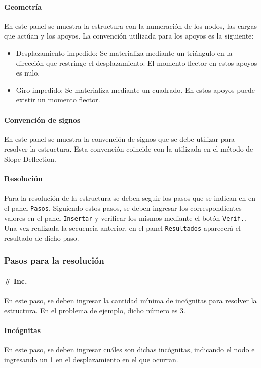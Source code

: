 \paragraph{Geometría}
En este panel se muestra la estructura con la numeración de los nodos, las cargas que actúan y los apoyos. La convención utilizada para los apoyos es la siguiente:
\begin{itemize}
	\item Desplazamiento impedido: Se materializa mediante un triángulo en la dirección que restringe el desplazamiento. El momento flector en estos apoyos es nulo.
	\item Giro impedido: Se materializa mediante un cuadrado. En estos apoyos puede existir un momento flector.  
\end{itemize}

\paragraph{Convención de signos}
En este panel se muestra la convención de signos que se debe utilizar para resolver la estructura. Esta convención coincide con la utilizada en el método de Slope-Deflection.

\paragraph{Resolución}
Para la resolución de la estructura se deben seguir los pasos que se indican en en el panel \verb|Pasos|. Siguiendo estos pasos, se deben ingresar los correspondientes valores en el panel \verb|Insertar| y verificar los mismos mediante el botón \verb|Verif.|. Una vez realizada la secuencia anterior, en el panel \verb|Resultados| aparecerá el resultado de dicho paso.

\subsubsection{Pasos para la resolución}

\paragraph{# Inc.}
En este paso, se deben ingresar la cantidad mínima de incógnitas para resolver la estructura. En el problema de ejemplo, dicho número es 3.

\paragraph{Incógnitas}
En este paso, se deben ingresar cuáles son dichas incógnitas, indicando el nodo e ingresando un 1 en el desplazamiento en el que ocurran.

